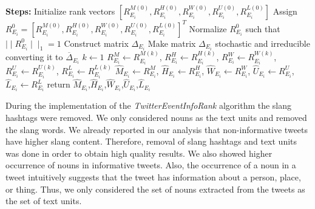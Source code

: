 \begin{algorithm}
\label{algo}
\BlankLine
{}
\BlankLine
\textbf{Steps:}
\BlankLine
Initialize rank vectors $[R_{{E_{i}}}^{M(0)}, R_{{E_{i}}}^{H(0)}, R_{{E_{i}}}^{W(0)}, R_{{E_{i}}}^{U(0)}, R_{{E_{i}}}^{L(0)}]$\;
\BlankLine
Assign $R_{E_{i}}^{0}=[R_{E_{i}}^{M(0)},R_{E_{i}}^{H(0)},R_{E_{i}}^{W(0)},R_{E_{i}}^{U(0)},R_{E_{i}}^{L(0)}]^{T} $\;
\BlankLine
Normalize $R_{E_{i}}^{0}$ such that $\mid \mid R_{E_{i}}^{0}\mid \mid_{1} = 1$ \;
\BlankLine
Construct matrix $\Delta_{E_{i}}$\;
\BlankLine
Make matrix $\Delta_{E_{i}}$ stochastic and irreducible converting it to $\overline \Delta_{E_{i}}$\;
\BlankLine
$k \leftarrow 1$ 
\BlankLine
{}
\BlankLine
$R_{E_{i}}^{M} \leftarrow R_{E_{i}}^{M(k)}$, $R_{E_{i}}^{H} \leftarrow R_{E_{i}}^{H(k)}$, $R_{E_{i}}^{W} \leftarrow R_{E_{i}}^{W(k)}$,  $R_{E_{i}}^{U} \leftarrow R_{E_{i}}^{U(k)}$, $R_{E_{i}}^{L} \leftarrow R_{E_{i}}^{L(k)}$\;
\BlankLine
$\hat{M}_{E_{i}} \leftarrow R_{E_{i}}^{M}$, $\hat{H}_{E_{i}} \leftarrow R_{E_{i}}^{H}$, $\hat{W}_{E_{i}} \leftarrow R_{E_{i}}^{W}$, $\hat{U}_{E_{i}} \leftarrow R_{E_{i}}^{U}$, $\hat{L}_{E_{i}} \leftarrow R_{E_{i}}^{L}$\;
\BlankLine
return $\hat{M}_{E_{i}}$,$\hat{H}_{E_{i}}$,$\hat{W}_{E_{i}}$,$\hat{U}_{E_{i}}$,$\hat{L}_{E_{i}}$\;
\end{algorithm}\DecMargin{1em}

During the implementation of the \textit{TwitterEventInfoRank} algorithm the slang hashtags were removed. We only considered nouns as the text units and removed the slang words. We already reported in our analysis that non-informative tweets have higher slang content. Therefore, removal of slang hashtags and text units was done in order to obtain high quality results. We also showed higher occurrence of nouns in informative tweets. Also, the occurrence of a noun in a tweet intuitively suggests that the tweet has information about a person, place, or thing. Thus, we only considered the set of nouns extracted from the tweets as the set of text units. 

